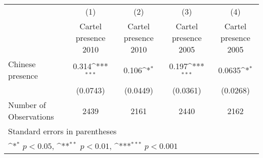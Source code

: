 {
\def\sym#1{\ifmmode^{#1}\else\(^{#1}\)\fi}
\begin{tabular}{l*{4}{c}}
\hline\hline
                    &\multicolumn{1}{c}{(1)}&\multicolumn{1}{c}{(2)}&\multicolumn{1}{c}{(3)}&\multicolumn{1}{c}{(4)}\\
                    &\multicolumn{1}{c}{Cartel presence 2010}&\multicolumn{1}{c}{Cartel presence 2010}&\multicolumn{1}{c}{Cartel presence 2005}&\multicolumn{1}{c}{Cartel presence 2005}\\
\hline
Chinese presence    &       0.314\sym{***}&       0.106\sym{*}  &       0.197\sym{***}&      0.0635\sym{*}  \\
                    &    (0.0743)         &    (0.0449)         &    (0.0361)         &    (0.0268)         \\
\hline
Number of Observations&        2439         &        2161         &        2440         &        2162         \\
\hline\hline
\multicolumn{5}{l}{\footnotesize Standard errors in parentheses}\\
\multicolumn{5}{l}{\footnotesize \sym{*} \(p<0.05\), \sym{**} \(p<0.01\), \sym{***} \(p<0.001\)}\\
\end{tabular}
}
